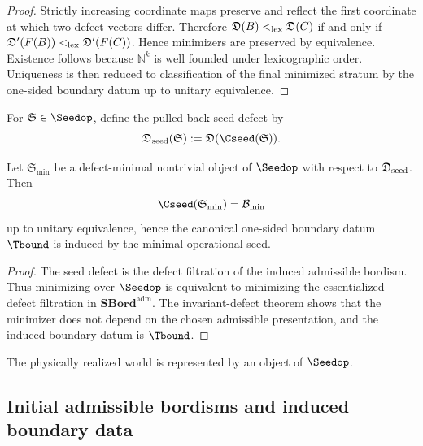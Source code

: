 \begin{proof}
Strictly increasing coordinate maps preserve and reflect the first coordinate at which two defect
vectors differ. Therefore $\mathfrak D(B)<_{\rm lex}\mathfrak D(C)$ if and only if
$\mathfrak D'(F(B))<_{\rm lex}\mathfrak D'(F(C))$. Hence minimizers are preserved by equivalence.
Existence follows because $\mathbb N^k$ is well founded under lexicographic order. Uniqueness is
then reduced to classification of the final minimized stratum by the one-sided boundary datum up to
unitary equivalence.
\end{proof}

\begin{definition}
\label{def:operational-seed-complexity}
For $\mathfrak S\in\Seedop$, define the pulled-back seed defect by
\begin{equation}
\mathfrak D_{\rm seed}(\mathfrak S):=\mathfrak D(\Cseed(\mathfrak S)).
\end{equation}
\end{definition}

\begin{corollary}
\label{cor:minimal-operational-seed}
Let $\mathfrak S_{\min}$ be a defect-minimal nontrivial object of $\Seedop$ with respect to
$\mathfrak D_{\rm seed}$. Then
\begin{equation}
\Cseed(\mathfrak S_{\min})=\mathcal B_{\min}
\end{equation}
up to unitary equivalence, hence the canonical one-sided boundary datum $\Tbound$ is induced by the
minimal operational seed.
\end{corollary}

\begin{proof}
The seed defect is the defect filtration of the induced admissible bordism. Thus minimizing over
$\Seedop$ is equivalent to minimizing the essentialized defect filtration in
$\mathbf{SBord}^{\mathrm{adm}}$. The invariant-defect theorem shows that the minimizer does not
depend on the chosen admissible presentation, and the induced boundary datum is $\Tbound$.
\end{proof}

\begin{axiom}
\label{ax:physical-operationality}
The physically realized world is represented by an object of $\Seedop$.
\end{axiom}

\subsection{Initial admissible bordisms and induced boundary data}

